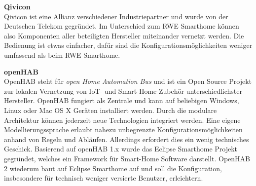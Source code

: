 \textbf{Qivicon} \\
Qivicon ist eine Allianz verschiedener Industriepartner und wurde von der Deutschen Telekom gegründet. Im Unterschied zum RWE Smarthome können also Komponenten aller beteiligten Hersteller miteinander vernetzt werden. Die Bedienung ist etwas einfacher, dafür sind die Konfigurationsmöglichkeiten weniger umfassend als beim RWE Smarthome.

\textbf{openHAB} \\
OpenHAB steht für \textit{open Home Automation Bus} und ist ein Open Source Projekt zur lokalen Vernetzung von IoT- und Smart-Home Zubehör unterschiedlichster Hersteller. OpenHAB fungiert als Zentrale und kann auf beliebigen Windows, Linux oder Mac OS X Geräten installiert werden. Durch die modulare Architektur können jederzeit neue Technologien integriert werden. Eine eigene Modellierungssprache erlaubt nahezu unbegrenzte Konfigurationsmöglichkeiten anhand von Regeln und Abläufen. Allerdings erfordert dies ein wenig technisches Geschick. Basierend auf openHAB 1.x wurde das Eclipse Smarthome Projekt gegründet, welches ein Framework für Smart-Home Software darstellt. OpenHAB 2 wiederum baut auf Eclipse Smarthome auf und soll die Konfiguration, insbesondere für technisch weniger versierte Benutzer, erleichtern.
